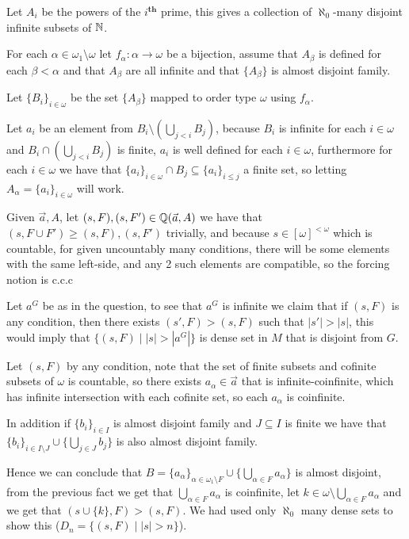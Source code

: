 \begin{cExercise}
	\begin{cPart}
		Let $A_i$ be the powers of the $i^\textbf{th}$ prime, this gives a collection of $\aleph_0$-many disjoint infinite subsets of $\mathbb N$.
		
		For each $\alpha\in\omega_1\setminus\omega$ let $f_\alpha:\alpha\to\omega$ be a bijection, assume that $A_\beta$ is defined for each $\beta<\alpha$ and that $A_\beta$ are all infinite and that $\{A_\beta\}$ is almost disjoint family.
		
		Let $\{B_i\}_{i\in\omega}$ be the set $\{A_\beta\}$ mapped to order type $\omega$ using $f_\alpha$.
		
		Let $a_i$ be an element from $B_i\setminus (\bigcup_{j<i}B_j)$, because $B_i$ is infinite for each $i\in\omega$ and $B_i\cap (\bigcup_{j<i}B_j)$ is finite, $a_i$ is well defined for each $i\in\omega$, furthermore for each $i\in\omega$ we have that $\{a_i\}_{i\in\omega}\cap B_j\subseteq \{a_i\}_{i\le j}$ a finite set, so letting $A_\alpha=\{a_i\}_{i\in\omega}$ will work.
	\end{cPart}
	\begin{cPart}
		Given $\vec{a},A$, let $(s,F),(s,F')\in\mathbb Q(\vec{a},A)$ we have that $(s,F\cup F')\ge (s,F),(s,F')$ trivially, and because $s\in[\omega]^{<\omega}$ which is countable, for given uncountably many conditions, there will be some elements with the same left-side, and any 2 such elements are compatible, so the forcing notion is c.c.c
		
		Let $a^G$ be as in the question, to see that $a^G$ is infinite we claim that if $(s,F)$ is any condition, then there exists $(s',F)>(s,F)$ such that $|s'|>|s|$, this would imply that $\{(s,F)\mid |s|>|a^G|\}$ is dense set in $M$ that is disjoint from $G$.
		
		Let $(s,F)$ by any condition, note that the set of finite subsets and cofinite subsets of $\omega$ is countable, so there exists $a_\alpha\in\vec{a}$ that is infinite-coinfinite, which has infinite intersection with each cofinite set, so each $a_\alpha$ is coinfinite.
		
		In addition if $\{b_i\}_{i\in I}$ is almost disjoint family and $J\subseteq I$ is finite we have that $\{b_i\}_{i\in I\setminus J}\cup\{\bigcup_{j\in J}b_j\}$ is also almost disjoint family.
		
		Hence we can conclude that $B=\{a_\alpha\}_{\alpha\in \omega_1\setminus F}\cup \{\bigcup_{\alpha\in F}a_\alpha\}$ is almost disjoint, from the previous fact we get that $\bigcup_{\alpha\in F}a_\alpha$ is coinfinite, let $k\in\omega\setminus \bigcup_{\alpha\in F}a_\alpha$ and we get that $(s\cup\{k\},F)>(s,F)$. We had used only $\aleph_0$ many dense sets to show this ($D_n=\{(s,F)\mid |s|>n\}$).
		

\end{cPart}
\end{cExercise}
